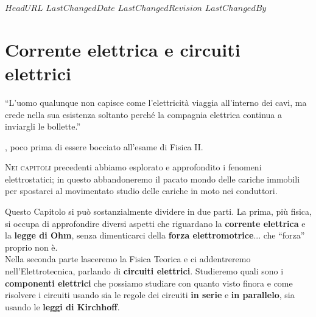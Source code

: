 \svnidlong
{$HeadURL$}
{$LastChangedDate$}
{$LastChangedRevision$}
{$LastChangedBy$}

\chapter{Corrente elettrica e circuiti elettrici}

\begin{introduction}
	``L’uomo qualunque non capisce come l’elettricità viaggia all’interno dei cavi, ma crede nella sua esistenza soltanto perché la compagnia elettrica continua a inviargli le bollette.''
	\begin{flushright}
		, poco prima di essere bocciato all'esame di Fisica II.
	\end{flushright}
\end{introduction}
\lettrine[findent=1pt, nindent=0pt]{N}{ei capitoli} precedenti abbiamo esplorato e approfondito i fenomeni elettrostatici; in questo abbandoneremo il pacato mondo delle cariche immobili per spostarci al movimentato studio delle cariche in moto nei conduttori.

Questo Capitolo si può sostanzialmente dividere in due parti. La prima, più fisica, si occupa di approfondire diversi aspetti che riguardano la \textbf{corrente elettrica} e la \textbf{legge di Ohm}, senza dimenticarci della \textbf{forza elettromotrice}... che ``forza'' proprio non è.\\
Nella seconda parte lasceremo la Fisica Teorica e ci addentreremo nell'Elettrotecnica, parlando di \textbf{circuiti elettrici}. Studieremo quali sono i \textbf{componenti elettrici} che possiamo studiare con quanto visto finora e come risolvere i circuiti usando sia le regole dei circuiti \textbf{in serie} e \textbf{in parallelo}, sia usando le \textbf{leggi di Kirchhoff}.
